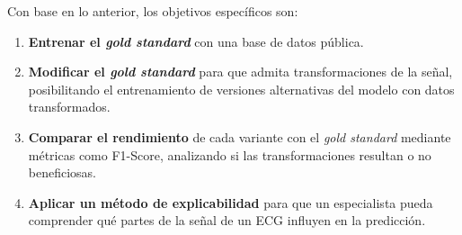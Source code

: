 Con base en lo anterior, los objetivos específicos son:

\begin{enumerate}
	\item \textbf{Entrenar el \emph{gold standard}} con una base de datos pública.
	\item \textbf{Modificar el \emph{gold standard}} para que admita transformaciones de la señal, posibilitando el entrenamiento de versiones alternativas del modelo con datos transformados.
	\item \textbf{Comparar el rendimiento} de cada variante con el \emph{gold standard} mediante métricas como F1-Score, analizando si las transformaciones resultan o no beneficiosas.
	\item \textbf{Aplicar un método de explicabilidad} para que un especialista pueda comprender qué partes de la señal de un ECG influyen en la predicción.
\end{enumerate}


